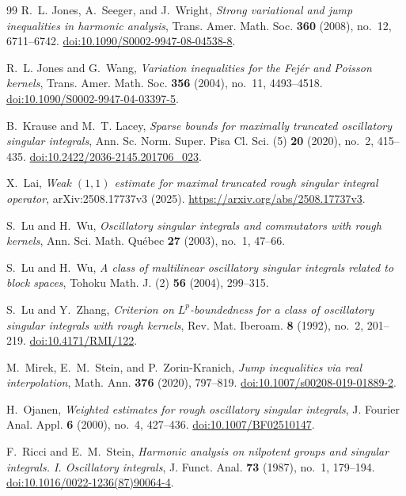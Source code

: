 \documentclass[11pt]{article}
\numberwithin{equation}{section}
\theoremstyle{remark}
\theoremstyle{definition}
\begin{document}
\begin{thebibliography}{99}
R.~L. Jones, A.~Seeger, and J.~Wright,
\emph{Strong variational and jump inequalities in harmonic analysis},
Trans. Amer. Math. Soc. \textbf{360} (2008), no.~12, 6711--6742.
\href{https://doi.org/10.1090/S0002-9947-08-04538-8}
{doi:10.1090/S0002-9947-08-04538-8}.


R.~L. Jones and G.~Wang,
\emph{Variation inequalities for the Fej\'er and Poisson kernels},
Trans. Amer. Math. Soc. \textbf{356} (2004), no.~11, 4493--4518.
\href{https://doi.org/10.1090/S0002-9947-04-03397-5}
{doi:10.1090/S0002-9947-04-03397-5}.

B.~Krause and M.~T. Lacey,
\emph{Sparse bounds for maximally truncated oscillatory singular integrals},
Ann. Sc. Norm. Super. Pisa Cl. Sci. (5) \textbf{20} (2020), no.~2,
415--435.
\href{https://doi.org/10.2422/2036-2145.201706_023}
{doi:10.2422/2036-2145.201706\_023}.

X.~Lai,
\emph{Weak $(1,1)$ estimate for maximal truncated rough singular integral
operator},
arXiv:2508.17737v3 (2025).
\url{https://arxiv.org/abs/2508.17737v3}.

S.~Lu and H.~Wu,
\emph{Oscillatory singular integrals and commutators with rough kernels},
Ann. Sci. Math. Qu\'ebec \textbf{27} (2003), no.~1, 47--66.

S.~Lu and H.~Wu,
\emph{A class of multilinear oscillatory singular integrals related to
block spaces},
Tohoku Math. J. (2) \textbf{56} (2004), 299--315.

S.~Lu and Y.~Zhang,
\emph{Criterion on $L^p$-boundedness for a class of oscillatory singular
integrals with rough kernels},
Rev. Mat. Iberoam. \textbf{8} (1992), no.~2, 201--219.
\href{https://doi.org/10.4171/RMI/122}{doi:10.4171/RMI/122}.

M.~Mirek, E.~M.~Stein, and P.~Zorin-Kranich,
\emph{Jump inequalities via real interpolation},
Math. Ann. \textbf{376} (2020), 797--819.
\href{https://doi.org/10.1007/s00208-019-01889-2}
{doi:10.1007/s00208-019-01889-2}.

H.~Ojanen,
\emph{Weighted estimates for rough oscillatory singular integrals},
J. Fourier Anal. Appl. \textbf{6} (2000), no.~4, 427--436.
\href{https://doi.org/10.1007/BF02510147}
{doi:10.1007/BF02510147}.

F.~Ricci and E.~M.~Stein,
\emph{Harmonic analysis on nilpotent groups and singular integrals. I.
Oscillatory integrals},
J. Funct. Anal. \textbf{73} (1987), no.~1, 179--194.
\href{https://doi.org/10.1016/0022-1236(87)90064-4}
{doi:10.1016/0022-1236(87)90064-4}.


\end{thebibliography}
\end{document}

